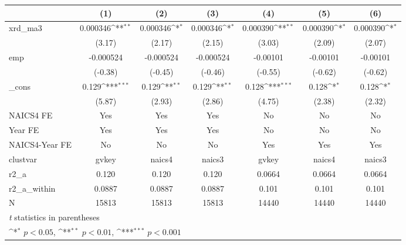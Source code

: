 {
\def\sym#1{\ifmmode^{#1}\else\(^{#1}\)\fi}
\begin{tabular}{l*{6}{c}}
\hline\hline
            &\multicolumn{1}{c}{(1)}         &\multicolumn{1}{c}{(2)}         &\multicolumn{1}{c}{(3)}         &\multicolumn{1}{c}{(4)}         &\multicolumn{1}{c}{(5)}         &\multicolumn{1}{c}{(6)}         \\
\hline
xrd\_ma3     &    0.000346\sym{**} &    0.000346\sym{*}  &    0.000346\sym{*}  &    0.000390\sym{**} &    0.000390\sym{*}  &    0.000390\sym{*}  \\
            &      (3.17)         &      (2.17)         &      (2.15)         &      (3.03)         &      (2.09)         &      (2.07)         \\
[1em]
emp         &   -0.000524         &   -0.000524         &   -0.000524         &    -0.00101         &    -0.00101         &    -0.00101         \\
            &     (-0.38)         &     (-0.45)         &     (-0.46)         &     (-0.55)         &     (-0.62)         &     (-0.62)         \\
[1em]
\_cons      &       0.129\sym{***}&       0.129\sym{**} &       0.129\sym{**} &       0.128\sym{***}&       0.128\sym{*}  &       0.128\sym{*}  \\
            &      (5.87)         &      (2.93)         &      (2.86)         &      (4.75)         &      (2.38)         &      (2.32)         \\
[1em]
NAICS4 FE   &         Yes         &         Yes         &         Yes         &          No         &          No         &          No         \\
[1em]
Year FE     &         Yes         &         Yes         &         Yes         &          No         &          No         &          No         \\
[1em]
NAICS4-Year FE&          No         &          No         &          No         &         Yes         &         Yes         &         Yes         \\
\hline
clustvar    &       gvkey         &      naics4         &      naics3         &       gvkey         &      naics4         &      naics3         \\
r2\_a        &       0.120         &       0.120         &       0.120         &      0.0664         &      0.0664         &      0.0664         \\
r2\_a\_within &      0.0887         &      0.0887         &      0.0887         &       0.101         &       0.101         &       0.101         \\
N           &       15813         &       15813         &       15813         &       14440         &       14440         &       14440         \\
\hline\hline
\multicolumn{7}{l}{\footnotesize \textit{t} statistics in parentheses}\\
\multicolumn{7}{l}{\footnotesize \sym{*} \(p<0.05\), \sym{**} \(p<0.01\), \sym{***} \(p<0.001\)}\\
\end{tabular}
}
